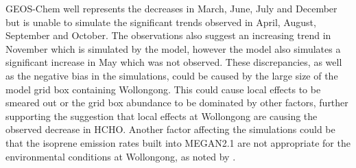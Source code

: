 \documentclass[draft]{agujournal}
\begin{document}
GEOS-Chem well represents the decreases in March, June, July and December but is unable to simulate the significant trends observed in April, August, September and October. The observations also suggest an increasing trend in November which is simulated by the model, however the model also simulates a significant increase in May which was not observed. These discrepancies, as well as the negative bias in the simulations, could be caused by the large size of the model grid box containing Wollongong. This could cause local effects to be smeared out or the grid box abundance to be dominated by other factors, further supporting the suggestion that local effects at Wollongong are causing the observed decrease in HCHO. Another factor affecting the simulations could be that the isoprene emission rates built into MEGAN2.1 are not appropriate for 
the environmental conditions at Wollongong, as noted by \citet{Emmerson2016}.

%
%
%
%
%
%
%
%
%
%

%
\end{document}
